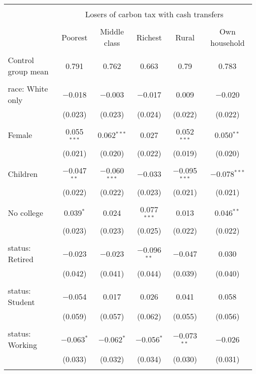 
\begin{tabular}{@{\extracolsep{5pt}}lccccc} 
\\[-1.8ex]\hline 
\hline \\[-1.8ex] 
 & \multicolumn{5}{c}{Losers of carbon tax with cash transfers} \\ 
\cline{2-6} 
\\[-1.8ex] & Poorest & Middle class & Richest & Rural & Own household \\ 
\hline \\[-1.8ex] 
 Control group mean & 0.791 & 0.762 & 0.663 & 0.79 & 0.783  \\ \hline \\[-1.8ex] race: White only & $-$0.018 & $-$0.003 & $-$0.017 & 0.009 & $-$0.020 \\ 
  & (0.023) & (0.023) & (0.024) & (0.022) & (0.022) \\ 
  & & & & & \\ 
 Female & 0.055$^{***}$ & 0.062$^{***}$ & 0.027 & 0.052$^{***}$ & 0.050$^{**}$ \\ 
  & (0.021) & (0.020) & (0.022) & (0.019) & (0.020) \\ 
  & & & & & \\ 
 Children & $-$0.047$^{**}$ & $-$0.060$^{***}$ & $-$0.033 & $-$0.095$^{***}$ & $-$0.078$^{***}$ \\ 
  & (0.022) & (0.022) & (0.023) & (0.021) & (0.021) \\ 
  & & & & & \\ 
 No college & 0.039$^{*}$ & 0.024 & 0.077$^{***}$ & 0.013 & 0.046$^{**}$ \\ 
  & (0.023) & (0.023) & (0.025) & (0.022) & (0.022) \\ 
  & & & & & \\ 
 status: Retired & $-$0.023 & $-$0.023 & $-$0.096$^{**}$ & $-$0.047 & 0.030 \\ 
  & (0.042) & (0.041) & (0.044) & (0.039) & (0.040) \\ 
  & & & & & \\ 
 status: Student & $-$0.054 & 0.017 & 0.026 & 0.041 & 0.058 \\ 
  & (0.059) & (0.057) & (0.062) & (0.055) & (0.056) \\ 
  & & & & & \\ 
 status: Working & $-$0.063$^{*}$ & $-$0.062$^{*}$ & $-$0.056$^{*}$ & $-$0.073$^{**}$ & $-$0.026 \\ 
  & (0.033) & (0.032) & (0.034) & (0.030) & (0.031) \\ 
  & & & & & \\ 

\end{tabular}
